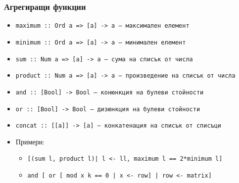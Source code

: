 \documentclass{beamer}
\begin{document}
\begin{frame}[fragile]
  \frametitle{Агрегиращи функции}
  \small
  \begin{itemize}
  \item \tt{maximum :: Ord a => [a] -> a} --- максимален елемент
  \item \tt{minimum :: Ord a => [a] -> a} --- минимален елемент
  \item \tt{sum :: Num a => [a] -> a} --- сума на списък от числа
  \item \tt{product :: Num a => [a] -> a} --- произведение на списък от числа
  \item \tt{and :: [Bool] -> Bool} --- конюнкция на булеви стойности
  \item \tt{or :: [Bool] -> Bool} --- дизюнкция на булеви стойности
  \item \tt{concat :: [[a]] -> [a]} --- конкатенация на списък от списъци
  \pause
  \item Примери:
    \begin{itemize}[<+->]
    \item \verb#[(sum l, product l)| l <- ll, maximum l == 2*minimum l]#
    \item \verb#and [ or [ mod x k == 0 | x <- row] | row <- matrix]#
    \end{itemize}
  \end{itemize}
\end{frame}
\end{document}
